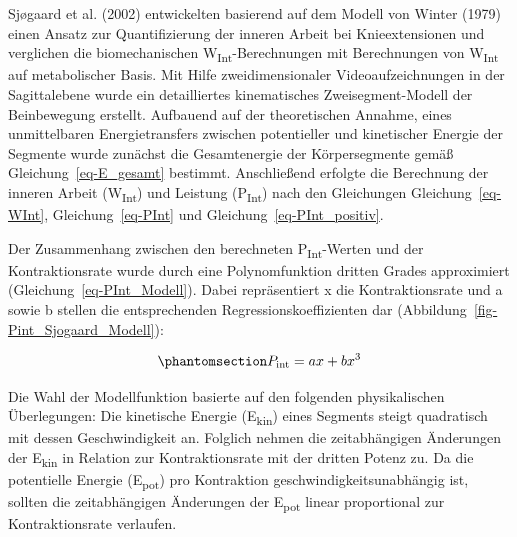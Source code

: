 \documentclass[
  letterpaper,
  DIV=11]{scrartcl}
\begin{document}
Sjøgaard et al. (2002) entwickelten basierend auf dem Modell von Winter
(1979) einen Ansatz zur Quantifizierung der inneren Arbeit bei
Knieextensionen und verglichen die biomechanischen
W\textsubscript{Int}-Berechnungen mit Berechnungen von
W\textsubscript{Int} auf metabolischer Basis. Mit Hilfe
zweidimensionaler Videoaufzeichnungen in der Sagittalebene wurde ein
detailliertes kinematisches Zweisegment-Modell der Beinbewegung
erstellt. Aufbauend auf der theoretischen Annahme, eines unmittelbaren
Energietransfers zwischen potentieller und kinetischer Energie der
Segmente wurde zunächst die Gesamtenergie der Körpersegmente gemäß
Gleichung~\ref{eq-E_gesamt} bestimmt. Anschließend erfolgte die
Berechnung der inneren Arbeit (W\textsubscript{Int}) und Leistung
(P\textsubscript{Int}) nach den Gleichungen Gleichung~\ref{eq-WInt},
Gleichung~\ref{eq-PInt} und Gleichung~\ref{eq-PInt_positiv}.

Der Zusammenhang zwischen den berechneten P\textsubscript{Int}-Werten
und der Kontraktionsrate wurde durch eine Polynomfunktion dritten Grades
approximiert (Gleichung~\ref{eq-PInt_Modell}). Dabei repräsentiert x die
Kontraktionsrate und a sowie b stellen die entsprechenden
Regressionskoeffizienten dar (Abbildung~\ref{fig-Pint_Sjogaard_Modell}):

\begin{equation}\phantomsection\label{eq-PInt_Modell}{P_\text{int} = ax + bx^3}\end{equation}

Die Wahl der Modellfunktion basierte auf den folgenden physikalischen
Überlegungen: Die kinetische Energie (E\textsubscript{kin}) eines
Segments steigt quadratisch mit dessen Geschwindigkeit an. Folglich
nehmen die zeitabhängigen Änderungen der E\textsubscript{kin} in
Relation zur Kontraktionsrate mit der dritten Potenz zu. Da die
potentielle Energie (E\textsubscript{pot}) pro Kontraktion
geschwindigkeitsunabhängig ist, sollten die zeitabhängigen Änderungen
der E\textsubscript{pot} linear proportional zur Kontraktionsrate
verlaufen.
\end{document}
